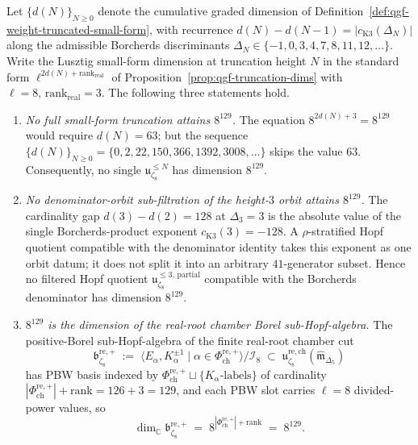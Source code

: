 \begin{theorem}
\label{thm:qgf-129-no-filtered-hopf-quotient}
Let $\{d(N)\}_{N\ge 0}$ denote the cumulative graded dimension of
Definition~\ref{def:qgf-weight-truncated-small-form}, with recurrence
$d(N)-d(N-1)=|c_{\mathrm K3}(\Delta_N)|$ along the admissible Borcherds
discriminants $\Delta_N\in\{-1,0,3,4,7,8,11,12,\ldots\}$. Write the
Lusztig small-form dimension at truncation height $N$ in the standard
form $\ell^{2d(N)+\mathrm{rank}_{\mathrm{real}}}$ of
Proposition~\ref{prop:qgf-truncation-dims} with
$\ell=8,\,\mathrm{rank}_{\mathrm{real}}=3$. The following three
statements hold.
\begin{enumerate}[label=\textup{(\roman*)}]
 \item \emph{No full small-form truncation attains $8^{129}$.} The
 equation $8^{2d(N)+3}=8^{129}$ would require $d(N)=63$; but the
 sequence $\{d(N)\}_{N\ge 0}=\{0,2,22,150,366,1392,3008,\ldots\}$
 skips the value $63$. Consequently, no single
 $\mathfrak u_{\zeta_8}^{\le N}$ has dimension $8^{129}$.
 \item \emph{No denominator-orbit sub-filtration of the height-$3$
 orbit attains $8^{129}$.} The cardinality gap
 $d(3)-d(2)=128$ at $\Delta_3=3$ is the absolute value of the
 single Borcherds-product exponent $c_{\mathrm K3}(3)=-128$.
 A $\rho$-stratified Hopf quotient compatible with the
 denominator identity takes this exponent as one orbit datum; it
 does not split it into an arbitrary $41$-generator subset. Hence
 no filtered Hopf quotient
 $\mathfrak u_{\zeta_8}^{\le 3,\,\text{partial}}$ compatible with
 the Borcherds denominator has dimension $8^{129}$.
 \item \emph{$8^{129}$ is the dimension of the real-root chamber Borel
 sub-Hopf-algebra.} The positive-Borel sub-Hopf-algebra of the
 finite real-root chamber cut
 \[
 \mathfrak b^{\mathrm{re},+}_{\zeta_8}
 \;:=\;
 \bigl\langle E_\alpha, K_\alpha^{\pm 1}\mid
 \alpha\in\Phi^{\mathrm{re},+}_{\mathrm{ch}}
 \bigr\rangle
 \big/\mathcal I_8
 \;\subset\;
 \mathfrak u_{\zeta_8}^{\mathrm{re,ch}}(\widehat{\mathfrak m}_{\Delta_5})
 \]
 has PBW basis indexed by
 \(\Phi^{\mathrm{re},+}_{\mathrm{ch}}\sqcup\{K_\alpha\text{-labels}\}\)
 of cardinality
 \(|\Phi^{\mathrm{re},+}_{\mathrm{ch}}|+\mathrm{rank}=126+3=129\),
 and each PBW slot carries $\ell=8$ divided-power values, so
 \[
 \boxed{\;\dim_{\mathbb C}\mathfrak b^{\mathrm{re},+}_{\zeta_8}
 \;=\;8^{|\Phi^{\mathrm{re},+}_{\mathrm{ch}}|+\mathrm{rank}}\;=\;8^{129}.\;}
\]
\end{enumerate}
\end{theorem}
